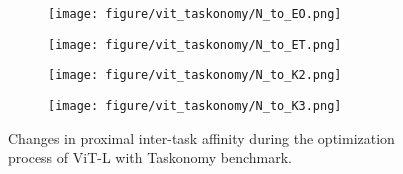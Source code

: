 \begin{figure}[h]
\begin{subfigure}{\figlength\textwidth}
\texttt{[image: figure/vit\_taskonomy/N\_to\_EO.png]}
\end{subfigure}
\begin{subfigure}{\figlength\textwidth}
\texttt{[image: figure/vit\_taskonomy/N\_to\_ET.png]}
\end{subfigure}
\begin{subfigure}{\figlength\textwidth}
\texttt{[image: figure/vit\_taskonomy/N\_to\_K2.png]}
\end{subfigure}
\begin{subfigure}{\figlength\textwidth}
\texttt{[image: figure/vit\_taskonomy/N\_to\_K3.png]}
\end{subfigure}
\caption{Changes in proximal inter-task affinity during the optimization process of ViT-L with Taskonomy benchmark.}
\end{figure}

